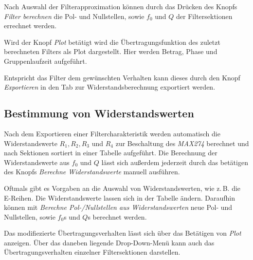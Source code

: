 Nach Auswahl der Filterapproximation können durch das Drücken des Knopfs \textit{Filter berechnen} die Pol- und Nullstellen, sowie $f_0$ und $Q$ der Filtersektionen errechnet werden.

Wird der Knopf \textit{Plot} betätigt wird die Übertragungsfunktion des zuletzt berechneten Filters als Plot dargestellt. 
Hier werden Betrag, Phase und Gruppenlaufzeit aufgeführt.

Entspricht das Filter dem gewünschten Verhalten kann dieses durch den Knopf \textit{Exportieren} in den Tab zur Widerstandsberechnung exportiert werden.

\subsection{Bestimmung von Widerstandswerten}

Nach dem Exportieren einer Filtercharakteristik werden automatisch die Widerstandswerte $R_1, R_2, R_3$ und $R_4$ zur Beschaltung des \textit{MAX274} berechnet und nach Sektionen sortiert in einer Tabelle aufgeführt.
Die Berechnung der Widerstandswerte aus $f_0$ und $Q$ lässt sich außerdem jederzeit durch das betätigen des Knopfs \textit{Berechne Widerstandswerte} manuell ausführen.

Oftmals gibt es Vorgaben an die Auswahl von Widerstandswerten, wie z.\,B. die E-Reihen. Die Widerstandswerte lassen sich in der Tabelle ändern. 
Daraufhin können mit \textit{Berechne Pol-/Nullstellen aus Widerstandswerten} neue Pol- und Nullstellen, sowie $f_0$s und $Q$s berechnet werden.

Das modifiezierte Übertragungsverhalten lässt sich über das Betätigen von \textit{Plot} anzeigen.
Über das daneben liegende Drop-Down-Menü kann auch das Übertragungsverhalten einzelner Filtersektionen darstellen.
